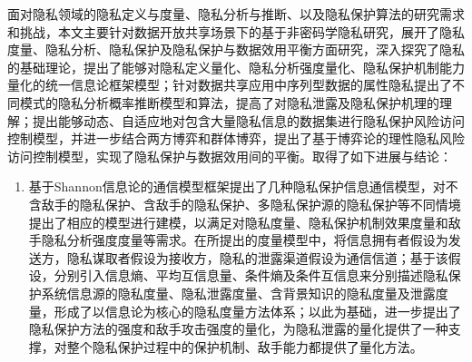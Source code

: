 面对隐私领域的隐私定义与度量、隐私分析与推断、以及隐私保护算法的研究需求和挑战，本文主要针对数据开放共享场景下的基于非密码学隐私研究，展开了隐私度量、隐私分析、隐私保护及隐私保护与数据效用平衡方面研究，深入探究了隐私的基础理论，提出了能够对隐私定义量化、隐私分析强度量化、隐私保护机制能力量化的统一信息论框架模型；针对数据共享应用中序列型数据的属性隐私提出了不同模式的隐私分析概率推断模型和算法，提高了对隐私泄露及隐私保护机理的理解；提出能够动态、自适应地对包含大量隐私信息的数据集进行隐私保护风险访问控制模型，并进一步结合两方博弈和群体博弈，提出了基于博弈论的理性隐私风险访问控制模型，实现了隐私保护与数据效用间的平衡。取得了如下进展与结论：
\begin{enumerate}
	\item 基于Shannon信息论的通信模型框架提出了几种隐私保护信息通信模型，对不含敌手的隐私保护、含敌手的隐私保护、多隐私保护源的隐私保护等不同情境提出了相应的模型进行建模，以满足对隐私度量、隐私保护机制效果度量和敌手隐私分析强度度量等需求。在所提出的度量模型中，将信息拥有者假设为发送方，隐私谋取者假设为接收方，隐私的泄露渠道假设为通信信道；基于该假设，分别引入信息熵、平均互信息量、条件熵及条件互信息来分别描述隐私保护系统信息源的隐私度量、隐私泄露度量、含背景知识的隐私度量及泄露度量，形成了以信息论为核心的隐私度量方法体系；以此为基础，进一步提出了隐私保护方法的强度和敌手攻击强度的量化，为隐私泄露的量化提供了一种支撑，对整个隐私保护过程中的保护机制、敌手能力都提供了量化方法。%
	

\end{enumerate}
